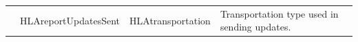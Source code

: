 \begin{landscape}
\begin{momtabletypeset}[8.00]
{{\begin{tabular}{|Y{146.95pt}|Y{146.60pt}|Y{126.62pt}|Y{211.97pt}|}
                    & HLAreportUpdatesSent              & HLAtransportation       & Transportation type used in sending updates.\allowbreak{}                                                                                                                                                                                                                                                                                                                                                                                                                                                                                                                                                                                                                                                                                                                                                                                                                                                                                                                                                                                                                                                                                                                                                                                                                                                                                                                                                                                                                                                                                                                 \\

\end{tabular}}}
\end{momtabletypeset}
\end{landscape}
